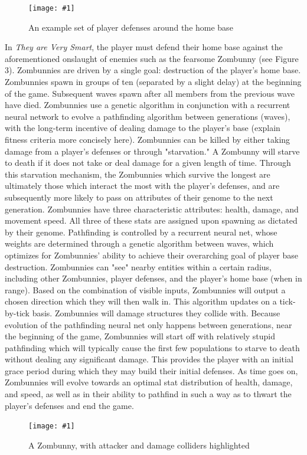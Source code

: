 \documentclass[letterpaper]{article}
\def\imfig#1#2{\begin{figure}[h] \centering \texttt{[image: \#1]} \caption{#2} \end{figure}}
\def\tavs{\textit{They are Very Smart}}
\begin{document}
\imfig{BaseExample}{An example set of player defenses around the home base}
In \tavs, the player must defend their home base against the aforementioned onslaught of enemies such as the fearsome Zombunny (see Figure 3). Zombunnies are driven by a single goal: destruction of the player's home base. Zombunnies spawn in groups of ten (separated by a slight delay) at the beginning of the game. Subsequent waves spawn after all members from the previous wave have died. Zombunnies use a genetic algorithm in conjunction with a recurrent neural network to evolve a pathfinding algorithm between generations (waves), with the long-term incentive of dealing damage to the player's base (explain fitness criteria more concisely here). Zombunnies can be killed by either taking damage from a player's defenses or through "starvation." A Zombunny will starve to death if it does not take or deal damage for a given length of time. Through this starvation mechanism, the Zombunnies which survive the longest are ultimately those which interact the most with the player's defenses, and are subsequently more likely to pass on attributes of their genome to the next generation. Zombunnies have three characteristic attributes: health, damage, and movement speed. All three of these stats are assigned upon spawning as dictated by their genome. Pathfinding is controlled by a recurrent neural net, whose weights are determined through a genetic algorithm between waves, which optimizes for Zombunnies' ability to achieve their overarching goal of player base destruction. Zombunnies can "see" nearby entities within a certain radius, including other Zombunnies, player defenses, and the player's home base (when in range). Based on the combination of visible inputs, Zombunnies will output a chosen direction which they will then walk in. This algorithm updates on a tick-by-tick basis. Zombunnies will damage structures they collide with. Because evolution of the pathfinding neural net only happens between generations, near the beginning of the game, Zombunnies will start off with relatively stupid pathfinding which will typically cause the first few populations to starve to death without dealing any significant damage. This provides the player with an initial grace period during which they may build their initial defenses. As time goes on, Zombunnies will evolve towards an optimal stat distribution of health, damage, and speed, as well as in their ability to pathfind in such a way as to thwart the player's defenses and end the game.

\imfig{ZombunnyColliders}{A Zombunny, with attacker and damage colliders highlighted}
\end{document}
